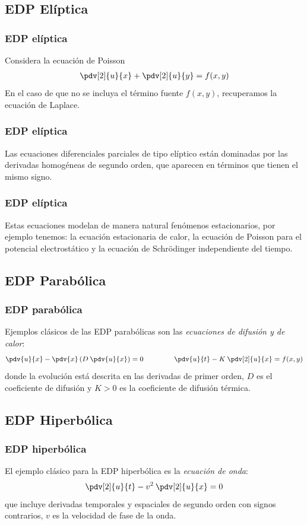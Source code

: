 \subsection{EDP Elíptica}
\begin{frame}
\frametitle{EDP elíptica}
Considera la ecuación de Poisson
\begin{align*}
\pdv[2]{u}{x} + \pdv[2]{u}{y} = f(x, y)
\end{align*}
En el caso de que no se incluya el término fuente $f(x, y)$, recuperamos la ecuación de Laplace.
\end{frame}
\begin{frame}
\frametitle{EDP elíptica}
Las ecuaciones diferenciales parciales de tipo elíptico están dominadas por las derivadas homogéneas de segundo orden, que aparecen en términos que tienen el mismo signo.
\end{frame}
\begin{frame}
\frametitle{EDP elíptica}
Estas ecuaciones modelan de manera natural fenómenos estacionarios, por ejemplo tenemos: la ecuación estacionaria de calor, la ecuación de Poisson para el potencial electrostático y la ecuación de Schrödinger independiente del tiempo.
\end{frame}
\subsection{EDP Parabólica}
\begin{frame}
\frametitle{EDP parabólica}
Ejemplos clásicos de las EDP parabólicas son las \emph{ecuaciones de difusión y de calor}:
\begin{align*}
\pdv{u}{x} - \pdv{x} \left( D \: \pdv{u}{x} \right) = 0 \hspace{1.5cm} \pdv{u}{t} - K \: \pdv[2]{u}{x}  = f(x, y)
\end{align*}
\pause
donde la evolución está descrita en las derivadas de primer orden, $D$ es el coeficiente de difusión y $K > 0$ es la coeficiente de difusión térmica.
\end{frame}
\subsection{EDP Hiperbólica}
\begin{frame}
\frametitle{EDP hiperbólica}
El ejemplo clásico para la EDP hiperbólica es la \emph{ecuación de onda}:
\begin{align*}
\pdv[2]{u}{t}  - v^{2} \: \pdv[2]{u}{x} = 0
\end{align*}
que incluye derivadas temporales y espaciales de segundo orden con signos contrarios, $v$ es la velocidad de fase de la onda.
\end{frame}
